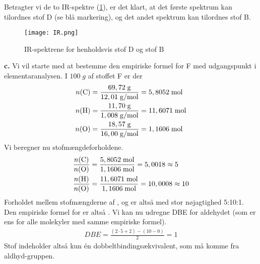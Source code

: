 \documentclass{report}
\begin{document}
Betragter vi de to IR-spektre (\cref{fig:IR}), er det klart, at det første spektrum kan tilordnes stof D (se blå markering), og det andet spektrum kan tilordnes stof B.
\begin{figure}[H]
\begin{center}
  \texttt{[image: IR.png]}
\end{center}
\caption{IR-spektrene for henholdsvis stof D og stof B}
\label{fig:IR}
\end{figure}
\noindent \textbf{c.}
Vi vil starte med at bestemme den empiriske formel for F med udgangspunkt i elementaranalysen.
I $100 \;\unit{g} $ af stoffet F er der
\begin{equation*}
\begin{split}
  n(\ce{C} )&= \frac{69,72 \;\unit{g} }{12,01 \;\unit{g/mol} }=5,8052 \;\unit{mol} \\
  n(\ce{H} )&= \frac{11,70 \;\unit{g} }{1,008 \;\unit{g/mol} }=11,6071 \;\unit{mol} \\
  n(\ce{O} )&= \frac{18,57 \;\unit{g} }{16,00 \;\unit{g/mol} }=1,1606 \;\unit{mol} 
\end{split}
\end{equation*}
Vi beregner nu stofmængdeforholdene.
\begin{equation*}
\begin{split}
  \frac{n(\ce{C} )}{n(\ce{O} )}&=\frac{5,8052 \;\unit{mol} }{1,1606 \;\unit{mol} }=5,0018 \approx 5 \\
  \frac{n(\ce{H} )}{n(\ce{O} )}&=\frac{11,6071 \;\unit{mol} }{1,1606 \;\unit{mol} }= 10,0008 \approx 10
\end{split}
\end{equation*}
Forholdet mellem stofmængderne af ,  og  er altså med stor nøjagtighed 5:10:1.
Den empiriske formel for  er altså .
Vi kan nu udregne DBE for aldehydet (som er ens for alle molekyler med samme empiriske formel).
\begin{equation*}
\begin{split}
  DBE=\frac{(2 \cdot 5 + 2) - (10-0)}{2}=1 
\end{split}
\end{equation*}
Stof  indeholder altså kun én dobbeltbindingsækvivalent, som må komme fra aldhyd-gruppen.
\end{document}
